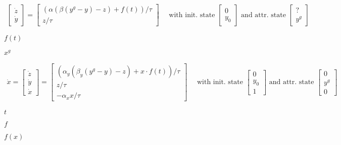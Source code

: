 \documentclass{article}
\begin{document}
\begin{eqnarray*} \left[ \begin{array}{l} {\dot{z}} \\ {\dot{y}} \end{array} \right] = \left[ \begin{array}{l} (\alpha (\beta({y}^{g}-{y})-{z}) + f(t))/\tau \\ {z}/\tau \end{array} \right] \mbox{~~~~with init. state~} \left[ \begin{array}{l} 0 \\ y_0 \end{array} \right] \mbox{~and attr. state~} \left[ \begin{array}{l} {?} \\ {y}^g \end{array} \right] \end{eqnarray*}
\pagebreak

$ f(t)$
\pagebreak

$ x^g $
\pagebreak

\begin{eqnarray*} \dot{x} = \left[ \begin{array}{l} {\dot{z}} \\ {\dot{y}} \\ {\dot{x}} \end{array} \right] = \left[ \begin{array}{l} (\alpha_y (\beta_y({y}^{g}-{y})-{z}) + x\cdot f(t))/\tau \\ {z}/\tau \\ -\alpha_x x/\tau \end{array} \right] \mbox{~~~~with init. state~} \left[ \begin{array}{l} 0 \\ y_0 \\ 1 \end{array} \right] \mbox{~and attr. state~} \left[ \begin{array}{l} {0} \\ {y}^g \\ 0 \end{array} \right] \end{eqnarray*}
\pagebreak

$ t $
\pagebreak

$ f $
\pagebreak

$ f(x)$
\pagebreak
\end{document}
